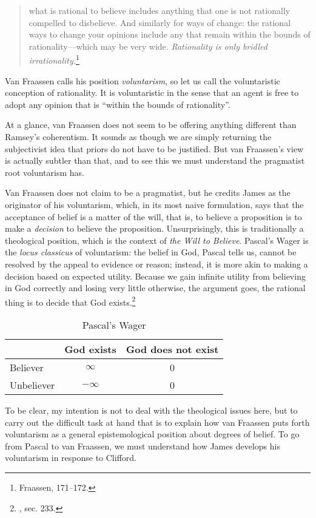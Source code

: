 \begin{quote}
what is rational to believe includes anything that one is not rationally
compelled to disbelieve. And similarly for ways of change: the rational
ways to change your opinions include any that remain within the bounds
of rationality---which may be very wide. \emph{Rationality is only
bridled irrationality.}\footnote{Fraassen, 171--172.}
\end{quote}

Van Fraassen calls his position \emph{voluntarism}, so let us call the
voluntaristic conception of rationality. It is voluntaristic in the
sense that an agent is free to adopt any opinion that is ``within the
bounds of rationality''.

At a glance, van Fraassen does not seem to be offering anything
different than Ramsey's coherentism. It sounds as though we are simply
returning the subjectivist idea that priors do not have to be justified.
But van Fraassen's view is actually subtler than that, and to see this
we must understand the pragmatist root voluntarism has.

Van Fraassen does not claim to be a pragmatist, but he credits James as
the originator of his voluntarism, which, in its most naive formulation,
says that the acceptance of belief is a matter of the will, that is, to
believe a proposition is to make a \emph{decision} to believe the
proposition. Unsurprisingly, this is traditionally a theological
position, which is the context of \emph{the Will to Believe}. Pascal's
Wager is the \emph{locus classicus} of voluntarism: the belief in God,
Pascal tells us, cannot be resolved by the appeal to evidence or reason;
instead, it is more akin to making a decision based on expected utility.
Because we gain infinite utility from believing in God correctly and
losing very little otherwise, the argument goes, the rational thing is
to decide that God exists.\footnote{\cite{pascal}, sec. 233.}

	\begin{table}[h]\label{pascalswager}
	\centering
  \begin{tabular}{l|cc}
    & God exists& God does not exist\\
    \hline
    Believer& $\infty$  & 0\\
    Unbeliever&$-\infty$ &0
  \end{tabular}
  \caption{Pascal's Wager}
  
\end{table}

To be clear, my intention is not to deal with the theological issues
here, but to carry out the difficult task at hand that is to explain how van Fraassen puts forth voluntarism as a general epistemological position about
degrees of belief. To go from Pascal to van Fraassen, we must understand
how James develops his voluntarism in response to Clifford.

